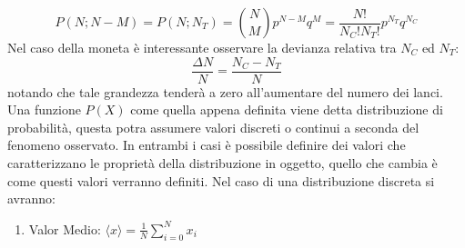 $$P(N;N-M) = P(N; N_T) = \binom{N}{M} p^{N-M}q^M = \frac{N!}{N_C!N_T!}p^{N_T}q^{N_C}$$
Nel caso della moneta è interessante osservare la devianza relativa tra $N_C$ ed $N_T$:
$$\frac{\Delta N}{N} = \frac{N_C-N_T}{N}$$
notando che tale grandezza tenderà a zero all'aumentare del numero dei lanci.
\\Una funzione $P(X)$ come quella appena definita viene detta distribuzione di probabilità, questa potra assumere valori discreti o continui a seconda del fenomeno osservato. In entrambi i casi è possibile definire dei valori che caratterizzano le proprietà della distribuzione in oggetto, quello che cambia è come questi valori verranno definiti. Nel caso di una distribuzione discreta si avranno:
\begin{enumerate}
    \item Valor Medio: $\langle x \rangle = \frac{1}{N}\sum_{i=0}^Nx_i$
\end{enumerate}
